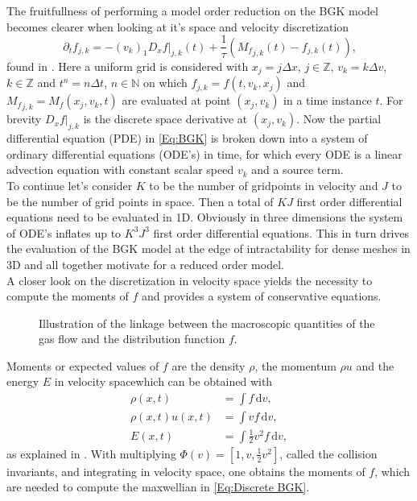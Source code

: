 The fruitfullness of performing a model order reduction on the BGK model becomes clearer when looking at it's space and velocity discretization
\begin{equation}
	\partial_t f_{j,k} = -(v_k)_1D_x f|_{j,k}(t) + \frac{1}{\tau}({M_f}_{j,k}(t) - f_{j,k}(t)) \text{,}
	\label{Eq:Discrete BGK}
\end{equation}
found in \cite{puppo2019kinetic}. Here a uniform grid is considered with \(x_j = j\Delta x\), \(j \in \mathbb{Z}\), \(v_k = k\Delta v\), \(k \in \mathbb{Z}\) and \(t^n = n \Delta t\), \(n \in \mathbb{N}\) on which \(f_{j,k} = f(t,v_k,x_j)\) and \({M_f}_{j,k} = M_f(x_j,v_k,t)\) are evaluated at point \((x_j,v_k)\) in a time instance \(t\). For brevity \(D_x f|_{j,k}\) is the discrete space derivative at \((x_j,v_k)\). Now the partial differential equation (PDE) in \cref{Eq:BGK} is broken down into a system of ordinary differential equations (ODE's) in time, for which every ODE is a linear advection equation with constant scalar speed \(v_k\) and a source term.\\
To continue let's consider \(K\) to be the number of gridpoints in velocity and \(J\) to be the number of grid points in space. Then a total of \(KJ\) first order differential equations need to be evaluated in 1D. Obviously in three dimensions the system of ODE's inflates up to \(K^3J^3\) first order differential equations. This in turn drives the evaluation of the BGK model at the edge of intractability for dense meshes in 3D and all together motivate for a reduced order model.\\
A closer look on the discretization in velocity space yields the necessity to compute the moments of \(f\) and provides a system of conservative equations.\\  
\begin{wrapfigure}{r}{0.5\textwidth}
	\vspace{-10pt}
	\scalebox{.9}{}
	\caption{Illustration of the linkage between the macroscopic quantities of the gas flow and the distribution function \(f\).}
	\vspace{-70pt}
	\label{Fig:Demo Macro}
\end{wrapfigure}
Moments or expected values of \(f\) are the density \(\rho\), the momentum \(\rho u\) and the energy \(E\) in velocity spacewhich can be obtained with
	\begin{align} 
	\rho(x,t) &= \int\! f \,\mathrm{d}v  \mathrm{,}\label{Eq:Moments1}\\
	\rho(x,t) u(x,t) &= \int\! v f \,\mathrm{d}v \mathrm{,}\label{Eq:Moments2}\\
	E(x,t) &= \int\! \frac{1}{2}v^2 f  \,\mathrm{d}v \mathrm{,}\label{Eq:Moments3}
	\end{align}
as explained in  \cite{puppo2019kinetic}. With multiplying \(\Phi(v) = [1,v,\frac{1}{2} v^2]\), called the collision invariants, and integrating in velocity space, one obtains the moments of \(f\), which are needed to compute the maxwellian in \cref{Eq:Discrete BGK}.\\


